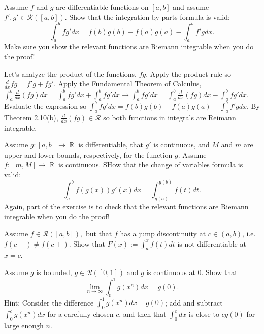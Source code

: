 \documentclass[12pt,letterpaper,boxed]{hmcpset}
\DeclareMathOperator{\R}{\mathbb{R}}
\begin{document}
\pagebreak
\begin{problem}[Exercise 2.16]
Assume $f$ and $g$ are differentiable functions on $[a,b]$ and assume $f', g' \in \mathcal{R}([a,b]).$ Show that the integration by parts formula is valid: $$\int_{a}^{b} fg'dx = f(b)g(b) - f(a)g(a) - \int_{a}^{b} f'gdx.$$ Make sure you show the relevant functions are Riemann integrable when you do the proof!
\end{problem}

\begin{solution}
Let's analyze the product of the functions, $fg$. Apply the product rule so $\frac{d}{dx}fg = f'g + fg'$. Apply the Fundamental Theorem of Calculus, $\int_{a}^{b} \frac{d}{dx}(fg)dx = \int_{a}^{b}fg'dx + \int_{a}^{b}fg'dx \rightarrow \int_{a}^{b}fg'dx = \int_{a}^{b}\frac{d}{dx}(fg) dx - \int_{a}^{b}fg'dx$. Evaluate the expression so $\int_{a}^{b}fg'dx = f(b)g(b) - f(a)g(a) - \int_{a}^{b}f'gdx$. By Theorem 2.10(b), $\frac{d}{dx}(fg) \in \mathcal{R}$ so both functions in integrals are Reimann integrable.
\end{solution}


\begin{problem}[Exercise 2.17]
Assume $g : [a, b] \rightarrow \R$ is differentiable, that $g'$ is continuous, and $M$ and $m$ are upper and lower bounds, respectively, for the function $g$. Assume $f : [m,M]\rightarrow\R$ is continuous. SHow that the change of variables formula is valid: $$\int_{a}^{b}f(g(x))g'(x)dx = \int_{g(a)}^{g(b)}f(t)dt.$$ Again, part of the exercise is to check that the relevant functions are Riemann integrable when you do the proof!
\end{problem}

\begin{solution}

\end{solution}

\begin{problem}[Exercise 2.18]
Assume $f \in \mathcal{R}([a,b]),$ but that $f$ has a jump discontinuity at $c \in (a,b)$, i.e. $f(c-)\neq f(c+).$ Show that $F(x) := \int_{a}^{x} f(t)dt$ is not differentiable at $x=c$.
\end{problem}

\begin{solution}

\end{solution}

\begin{problem}[Exercise 2.20]
Assume $g$ is bounded, $g \in \mathcal{R}([0,1])$ and $g$ is continuous at 0. Show that $$\lim_{n\rightarrow \infty}\int_{0}^{1}g(x^{n})dx = g(0).$$ Hint: Consider the difference $\int_{0}^{1}g(x^{n})dx - g(0)$; add and subtract $\int_{0}^{c} g(x^{n})dx$ for a carefully chosen $c$, and then that $\int_{0}^{c}dx$ is close to $cg(0)$ for large enough $n.$
\end{problem}
\end{document}
